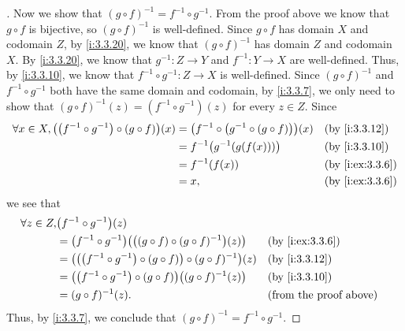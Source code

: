\begin{proof}[]
  Now we show that \((g \circ f)^{-1} = f^{-1} \circ g^{-1}\).
  From the proof above we know that \(g \circ f\) is bijective, so \((g \circ f)^{-1}\) is well-defined.
  Since \(g \circ f\) has domain \(X\) and codomain \(Z\), by \cref{i:3.3.20}, we know that \((g \circ f)^{-1}\) has domain \(Z\) and codomain \(X\).
  By \cref{i:3.3.20}, we know that \(g^{-1} : Z \to Y\) and \(f^{-1} : Y \to X\) are well-defined.
  Thus, by \cref{i:3.3.10}, we know that \(f^{-1} \circ g^{-1} : Z \to X\) is well-defined.
  Since \((g \circ f)^{-1}\) and \(f^{-1} \circ g^{-1}\) both have the same domain and codomain, by \cref{i:3.3.7}, we only need to show that \((g \circ f)^{-1}(z) = (f^{-1} \circ g^{-1})(z)\) for every \(z \in Z\).
  Since
  \begin{align*}
    \forall x \in X, \pa{\pa{f^{-1} \circ g^{-1}} \circ (g \circ f)}(x) & = \pa{f^{-1} \circ \pa{g^{-1} \circ \pa{g \circ f}}}(x) &  & \by{i:3.3.12}   \\
                                                                        & = f^{-1}\pa{g^{-1}\pa{g(f(x))}}                         &  & \by{i:3.3.10}   \\
                                                                        & = f^{-1}(f(x))                                          &  & \by{i:ex:3.3.6} \\
                                                                        & = x,                                                    &  & \by{i:ex:3.3.6}
  \end{align*}
  we see that
  \begin{align*}
    \forall z \in Z, & \pa{f^{-1} \circ g^{-1}}(z)                                                                                         \\
                     & = \pa{f^{-1} \circ g^{-1}}\pa{\pa{(g \circ f) \circ (g \circ f)^{-1}}(z)}        &  & \by{i:ex:3.3.6}               \\
                     & = \pa{\pa{\pa{f^{-1} \circ g^{-1}} \circ (g \circ f)} \circ (g \circ f)^{-1}}(z) &  & \by{i:3.3.12}                 \\
                     & = \pa{\pa{f^{-1} \circ g^{-1}} \circ (g \circ f)}\pa{(g \circ f)^{-1}(z)}        &  & \by{i:3.3.10}                 \\
                     & = (g \circ f)^{-1}(z).                                                           &  & \text{(from the proof above)}
  \end{align*}
  Thus, by \cref{i:3.3.7}, we conclude that \((g \circ f)^{-1} = f^{-1} \circ g^{-1}\).
\end{proof}


